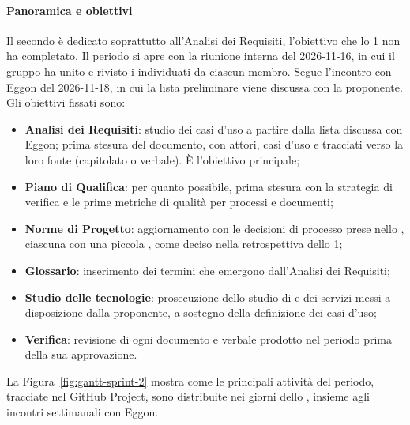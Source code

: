 \documentclass[documento]{gpt}
\newcommand{\subsubsubsection}[1]{\paragraph{#1}}
\begin{document}
\subsubsubsection{Panoramica e obiettivi}
Il secondo  è dedicato soprattutto all'Analisi
dei Requisiti, l'obiettivo che lo  1 non ha
completato. Il periodo si apre con la riunione interna del 2026-11-16, in
cui il gruppo ha unito e rivisto i  individuati
da ciascun membro. Segue l'incontro con Eggon del 2026-11-18, in cui la
lista preliminare viene discussa con la proponente. Gli obiettivi fissati
sono:
\begin{itemize}
  \item \textbf{Analisi dei Requisiti}: studio dei casi d'uso a partire
        dalla lista discussa con Eggon; prima stesura del documento, con
        attori, casi d'uso e  tracciati verso la
        loro fonte (capitolato o verbale). È l'obiettivo principale;
  \item \textbf{Piano di Qualifica}: per quanto possibile, prima stesura
        con la strategia di verifica e le prime metriche di qualità per
        processi e documenti;
  \item \textbf{Norme di Progetto}: aggiornamento con le decisioni di
        processo prese nello , ciascuna con una
        piccola , come deciso nella
        retrospettiva dello  1;
  \item \textbf{Glossario}: inserimento dei termini che emergono
        dall'Analisi dei Requisiti;
  \item \textbf{Studio delle tecnologie}: prosecuzione dello studio di
         e dei servizi  messi a disposizione
        dalla proponente, a sostegno della definizione dei casi d'uso;
  \item \textbf{Verifica}: revisione di ogni documento e verbale prodotto
        nel periodo prima della sua approvazione.
\end{itemize}

La Figura~\ref{fig:gantt-sprint-2} mostra come le principali attività del periodo,
tracciate nel GitHub Project, sono distribuite nei giorni dello
, insieme agli incontri settimanali con Eggon.


\end{document}

